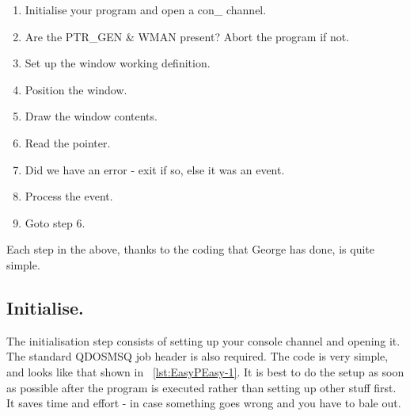 \begin{enumerate}[itemsep=0pt]

\item{}Initialise your program and open a con\_ channel.

\item{}Are the PTR\_GEN \& WMAN present? Abort the program if not.

\item{}Set up the window working definition.

\item{}Position the window.

\item{}Draw the window contents.

\item{}Read the pointer.

\item{}Did we have an error -{} exit if so, else it was an event.

\item{}Process the event.

\item{}Goto step 6.

\end{enumerate}

Each step in the above, thanks to the coding that George has done,
    is quite simple.

\subsection{Initialise.}

The initialisation step consists of setting up your console
      channel and opening it. The standard QDOSMSQ job header is also
      required. The code is very simple, and looks like that shown in \lstlistingname~\ref{lst:EasyPEasy-1}. It
      is best to do the setup as soon as possible after the program is
      executed rather than setting up other stuff first. It saves time and
      effort -{} in case something goes wrong and you have to bale out.

